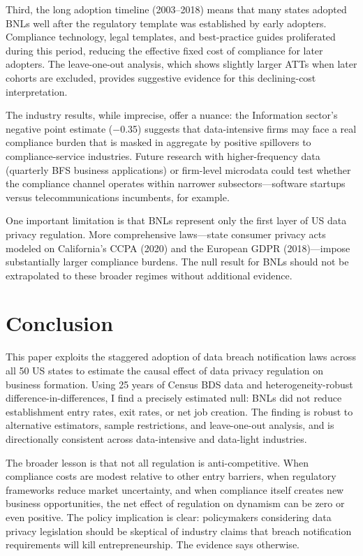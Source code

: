 \documentclass[12pt]{article}
\begin{document}
Third, the long adoption timeline (2003--2018) means that many states adopted BNLs well after the regulatory template was established by early adopters. Compliance technology, legal templates, and best-practice guides proliferated during this period, reducing the effective fixed cost of compliance for later adopters. The leave-one-out analysis, which shows slightly larger ATTs when later cohorts are excluded, provides suggestive evidence for this declining-cost interpretation.

The industry results, while imprecise, offer a nuance: the Information sector's negative point estimate ($-$0.35) suggests that data-intensive firms may face a real compliance burden that is masked in aggregate by positive spillovers to compliance-service industries. Future research with higher-frequency data (quarterly BFS business applications) or firm-level microdata could test whether the compliance channel operates within narrower subsectors---software startups versus telecommunications incumbents, for example.

One important limitation is that BNLs represent only the first layer of US data privacy regulation. More comprehensive laws---state consumer privacy acts modeled on California's CCPA (2020) and the European GDPR (2018)---impose substantially larger compliance burdens. The null result for BNLs should not be extrapolated to these broader regimes without additional evidence.


\section{Conclusion}

This paper exploits the staggered adoption of data breach notification laws across all 50 US states to estimate the causal effect of data privacy regulation on business formation. Using 25 years of Census BDS data and heterogeneity-robust difference-in-differences, I find a precisely estimated null: BNLs did not reduce establishment entry rates, exit rates, or net job creation. The finding is robust to alternative estimators, sample restrictions, and leave-one-out analysis, and is directionally consistent across data-intensive and data-light industries.

The broader lesson is that not all regulation is anti-competitive. When compliance costs are modest relative to other entry barriers, when regulatory frameworks reduce market uncertainty, and when compliance itself creates new business opportunities, the net effect of regulation on dynamism can be zero or even positive. The policy implication is clear: policymakers considering data privacy legislation should be skeptical of industry claims that breach notification requirements will kill entrepreneurship. The evidence says otherwise.
\end{document}
